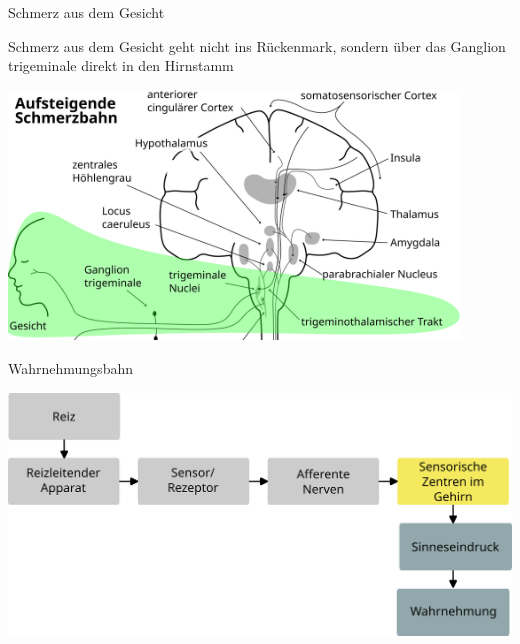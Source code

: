 \documentclass{beamer}
\begin{document}
\begin{frame}{Schmerz aus dem Gesicht}

Schmerz aus dem Gesicht geht nicht ins Rückenmark, sondern über das Ganglion trigeminale direkt in den Hirnstamm \\[0.2 cm]

\begin{center}
    \includegraphics[width=0.9\textwidth]{Schmerz_aufsteigend_Gesicht.png}
\end{center}


\end{frame}






\begin{frame}{Wahrnehmungsbahn}
    
    \begin{center}
        \includegraphics[width=\textwidth]{wahrnehmungsprozess_ohne_beispiel_gehirn.png}
    
    \end{center}
    
\end{frame}
\end{document}
